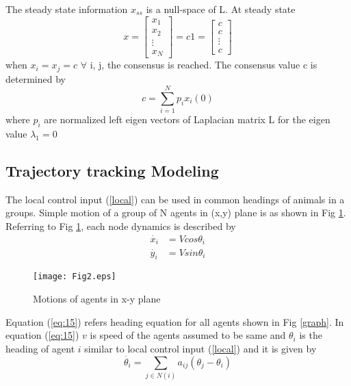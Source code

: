 \documentclass[twocolumn]{IETEJR}
\begin{document}
The steady state information $x_{ss}$ is a null-space of L. At steady state 
\begin{equation}
x=\begin{bmatrix}
x_{1} \\
x_{2} \\
\vdots \\
x_{N}
\end{bmatrix}=c1=\begin{bmatrix}
c\\
c \\
\vdots \\
c
\end{bmatrix}    
\end{equation} 
when $x_{i}=x_{j}=c$  $\forall$ i, j, the consensus is reached. The consensus value c is determined by 
\begin{equation}
c=\sum_{i=1}^{N}p_{i}x_{i}(0)
\label{eq:14}
\end{equation}
where $p_{i}$ are normalized left eigen vectors of Laplacian matrix L for the eigen value $\lambda_{1}=0$

\subsection{Trajectory tracking Modeling}
The local control input (\ref{local}) can be used in common headings of animals in a groups.
Simple motion of a group of N agents in (x,y) plane is as shown in Fig \ref{motion}.
Referring to Fig \ref{motion}, each node dynamics is described by 
\begin{equation}
\begin{aligned}
\dot{x_{i}} &=V cos\theta_{i} \\ 
\dot{y_{i}} &=V sin\theta_{i}
\label{eq:15}
\end{aligned}
\end{equation}
\begin{figure}[h]
	\centering
	\texttt{[image: Fig2.eps]}
	\caption{Motions of agents in x-y plane}
	\label{motion}
\end{figure}
Equation (\ref{eq:15}) refers heading equation for all agents shown in Fig \ref{graph}.
In equation (\ref{eq:15}) $v$ is speed of the agents assumed to be same and $\theta_{i}$ is the heading of agent $i$ similar to local control input (\ref{local}) and it is given by 
\begin{equation}
\dot{\theta_{i}} =\sum_{j \in N(i)}a_{ij}(\theta_{j}-\theta_{i}) \label{eq:16}
\end{equation}
\end{document}
